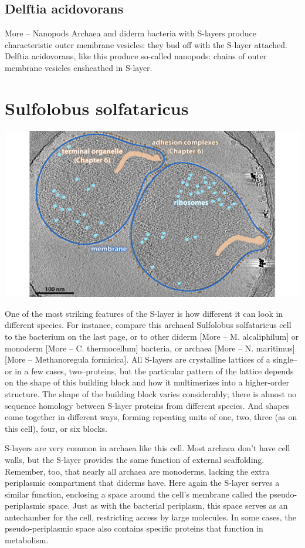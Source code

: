 \documentclass[]{tufte-book}
\begin{document}
\subsection{Delftia acidovorans}\label{delftia-acidovorans}

More -- Nanopods Archaea and diderm bacteria with S-layers produce
characteristic outer membrane vesicles: they bud off with the S-layer
attached. Delftia acidovorans, like this produce so-called nanopods:
chains of outer membrane vesicles ensheathed in S-layer.

\section{Sulfolobus solfataricus}\label{sulfolobus-solfataricus}

\includegraphics{img/02_static/2_1_Mgenitalium}

One of the most striking features of the S-layer is how different it can
look in different species. For instance, compare this archaeal
Sulfolobus solfataricus cell to the bacterium on the last page, or to
other diderm {[}More -- M. alcaliphilum{]} or monoderm {[}More -- C.
thermocellum{]} bacteria, or archaea {[}More -- N. maritimus{]} {[}More
-- Methanoregula formicica{]}. All S-layers are crystalline lattices of
a single--or in a few cases, two--proteins, but the particular pattern
of the lattice depends on the shape of this building block and how it
multimerizes into a higher-order structure. The shape of the building
block varies considerably; there is almost no sequence homology between
S-layer proteins from different species. And shapes come together in
different ways, forming repeating units of one, two, three (as on this
cell), four, or six blocks.

S-layers are very common in archaea like this cell. Most archaea don't
have cell walls, but the S-layer provides the same function of external
scaffolding. Remember, too, that nearly all archaea are monoderms,
lacking the extra periplasmic compartment that diderms have. Here again
the S-layer serves a similar function, enclosing a space around the
cell's membrane called the pseudo-periplasmic space. Just as with the
bacterial periplasm, this space serves as an antechamber for the cell,
restricting access by large molecules. In some cases, the
pseudo-periplasmic space also contains specific proteins that function
in metabolism.
\end{document}
